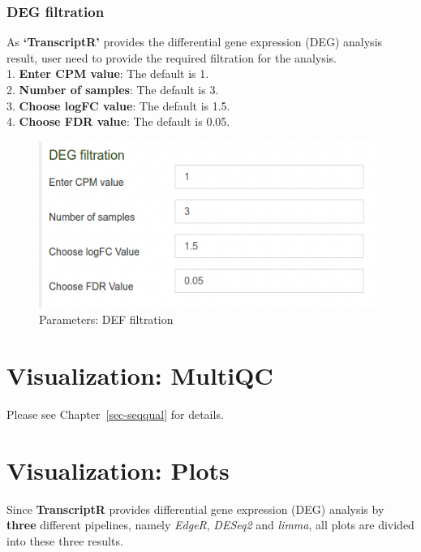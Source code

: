 \documentclass[
  a4paper,
  oneside,
  open=any]{scrreport}
\begin{document}
\hypertarget{deg-filtration}{%
\subsubsection{DEG filtration}\label{deg-filtration}}

As \textbf{`TranscriptR'} provides the differential gene expression
(DEG) analysis result, user need to provide the required filtration for
the analysis.\\
1. \textbf{Enter CPM value}: The default is 1.\\
2. \textbf{Number of samples}: The default is 3.\\
3. \textbf{Choose logFC value}: The default is 1.5.\\
4. \textbf{Choose FDR value}: The default is 0.05.

\begin{figure}[H]

{\centering \includegraphics{./_images/transcriptome/transcript7.png}

}

\caption{\label{fig-trans6}Parameters: DEF filtration}

\end{figure}

\hypertarget{visualization-multiqc}{%
\section{Visualization: MultiQC}\label{visualization-multiqc}}

Please see Chapter~\ref{sec-seqqual} for details.

\hypertarget{visualization-plots}{%
\section{Visualization: Plots}\label{visualization-plots}}

Since \textbf{TranscriptR} provides differential gene expression (DEG)
analysis by \textbf{three} different pipelines, namely \emph{EdgeR},
\emph{DESeq2} and \emph{limma}, all plots are divided into these three
results.
\end{document}

